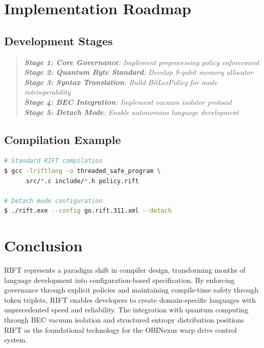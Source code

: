 \documentclass[12pt]{article}
\newenvironment{hodos}{\begin{quote}\itshape}{\end{quote}}
\begin{document}
\section{Implementation Roadmap}

\subsection{Development Stages}
\begin{hodos}
\textbf{Stage 1: Core Governance}: Implement preprocessing policy enforcement\\[0.5em]
\textbf{Stage 2: Quantum Byte Standard}: Develop 8-qubit memory allocator\\[0.5em]
\textbf{Stage 3: Syntax Translation}: Build BitLexPolicy for mode interoperability\\[0.5em]
\textbf{Stage 4: BEC Integration}: Implement vacuum isolator protocol\\[0.5em]
\textbf{Stage 5: Detach Mode}: Enable autonomous language development
\end{hodos}

\subsection{Compilation Example}
\begin{lstlisting}[language=bash]
# Standard RIFT compilation
$ gcc -lriftlang -o threaded_safe_program \
      src/*.c include/*.h policy.rift

# Detach mode configuration
$ ./rift.exe --config go.rift.311.xml --detach
\end{lstlisting}

\section{Conclusion}
RIFT represents a paradigm shift in compiler design, transforming months of language development into configuration-based specification. By enforcing governance through explicit policies and maintaining compile-time safety through token triplets, RIFT enables developers to create domain-specific languages with unprecedented speed and reliability. The integration with quantum computing through BEC vacuum isolation and structured entropy distribution positions RIFT as the foundational technology for the OBINexus warp drive control system.

\appendix
\end{document}
